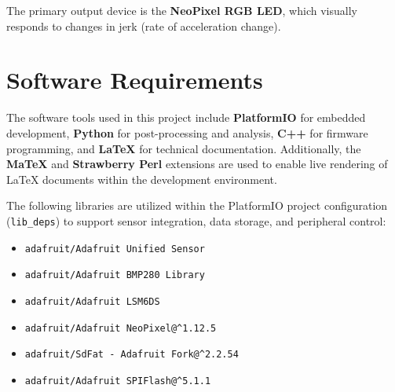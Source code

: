 \documentclass[12pt]{report}
\begin{document}
The primary output device is the \textbf{NeoPixel RGB LED}, which visually responds to changes in jerk (rate of acceleration change).



\chapter{Software Requirements}
The software tools used in this project include \textbf{PlatformIO} for embedded development, \textbf{Python} for post-processing and analysis, \textbf{C++} for firmware programming, and \textbf{LaTeX} for technical documentation. Additionally, the \textbf{MaTeX} and \textbf{Strawberry Perl} extensions are used to enable live rendering of LaTeX documents within the development environment.

The following libraries are utilized within the PlatformIO project configuration (\texttt{lib\_deps}) to support sensor integration, data storage, and peripheral control:

\begin{itemize}
    \item \texttt{adafruit/Adafruit Unified Sensor}
    \item \texttt{adafruit/Adafruit BMP280 Library}
    \item \texttt{adafruit/Adafruit LSM6DS}
    \item \texttt{adafruit/Adafruit NeoPixel@\^{}1.12.5}
    \item \texttt{adafruit/SdFat - Adafruit Fork@\^{}2.2.54}
    \item \texttt{adafruit/Adafruit SPIFlash@\^{}5.1.1}
\end{itemize}
\end{document}

